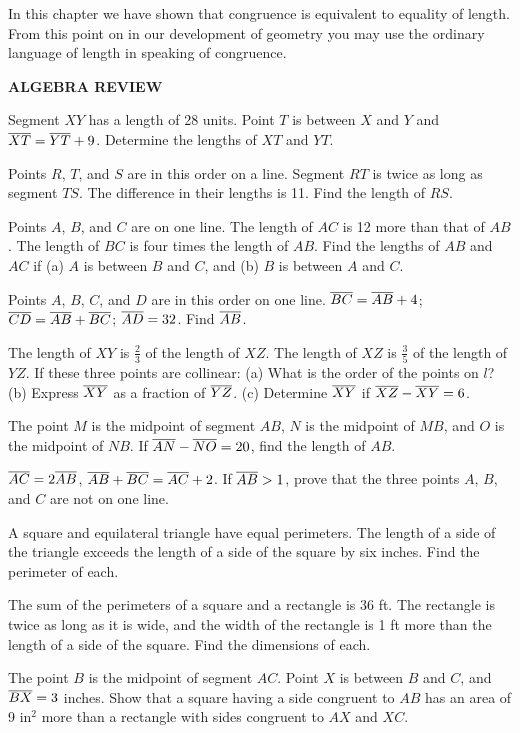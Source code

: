 \documentclass[11pt]{book}
\newcommand{\Vhead}[1]{%
  \par\bigskip\begin{center}\bfseries\large\MakeUppercase{#1}\end{center}%
  \par\nopagebreak\medskip}
\begin{document}
\begin{exercisecols}
\begin{note}
In this chapter we have shown that congruence is equivalent to equality of
length. From this point on in our development of geometry you may use the
ordinary language of length in speaking of congruence.
\end{note}

\Vhead{Algebra Review}

\begin{exlist}
\item Segment $XY$ has a length of 28 units. Point $T$ is between $X$ and $Y$
      and $\overline{XT} = \overline{YT} + 9$. Determine the lengths of $XT$ and $YT$.
\item Points $R$, $T$, and $S$ are in this order on a line. Segment $RT$ is
      twice as long as segment $TS$. The difference in their lengths is 11.
      Find the length of $RS$.
\item Points $A$, $B$, and $C$ are on one line. The length of $AC$ is 12 more
      than that of $AB$. The length of $BC$ is four times the length of $AB$.
      Find the lengths of $AB$ and $AC$ if (a) $A$ is between $B$ and $C$, and
      (b) $B$ is between $A$ and $C$.
\item Points $A$, $B$, $C$, and $D$ are in this order on one line.
      $\overline{BC} = \overline{AB} + 4$; $\overline{CD} = \overline{AB} + \overline{BC}$; $\overline{AD} = 32$.
      Find $\overline{AB}$.
\item The length of $XY$ is $\frac{2}{3}$ of the length of $XZ$. The length of
      $XZ$ is $\frac{3}{5}$ of the length of $YZ$. If these three points are
      collinear: (a) What is the order of the points on $l$? (b) Express
      $\overline{XY}$ as a fraction of $\overline{YZ}$. (c) Determine $\overline{XY}$ if
      $\overline{XZ} - \overline{XY} = 6$.
\item The point $M$ is the midpoint of segment $AB$, $N$ is the midpoint of
      $MB$, and $O$ is the midpoint of $NB$. If $\overline{AN} - \overline{NO} = 20$, find
      the length of $AB$.
\item $\overline{AC} = 2\overline{AB}$, $\overline{AB} + \overline{BC} = \overline{AC} + 2$. If
      $\overline{AB} > 1$, prove that the three points $A$, $B$, and $C$ are not on
      one line.
\item A square and equilateral triangle have equal perimeters. The length of a
      side of the triangle exceeds the length of a side of the square by six
      inches. Find the perimeter of each.
\item The sum of the perimeters of a square and a rectangle is 36 ft. The
      rectangle is twice as long as it is wide, and the width of the rectangle
      is 1 ft more than the length of a side of the square. Find the dimensions
      of each.
\item The point $B$ is the midpoint of segment $AC$. Point $X$ is between $B$
      and $C$, and $\overline{BX} = 3$ inches. Show that a square having a side
      congruent to $AB$ has an area of 9 in$^2$ more than a rectangle with
      sides congruent to $AX$ and $XC$.
\end{exlist}
\end{exercisecols}
\end{document}
